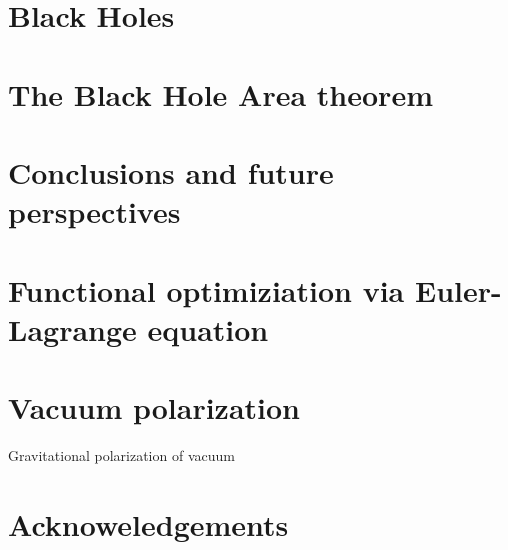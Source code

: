 \documentclass[12pt, a4paper]{book}
\begin{document}
\chapter{Black Holes}
\label{ch:black-holes}


\chapter{The Black Hole Area theorem}
\label{ch:area-theorem}


\chapter[Conclusions]{Conclusions and future perspectives}


\appendix
\chapter[Euler-Lagrange optimization]{Functional optimiziation via Euler-Lagrange equation}
\label{app:V-E-L-optimization}
\pagestyle{appendix-ruled}


\chapter{Vacuum polarization}{Gravitational polarization of vacuum}
\label{app:visser}


\chapter*{Acknoweledgements}
\pagestyle{acknowledgments}



\printbibliography[heading=bibintoc]
\end{document}
